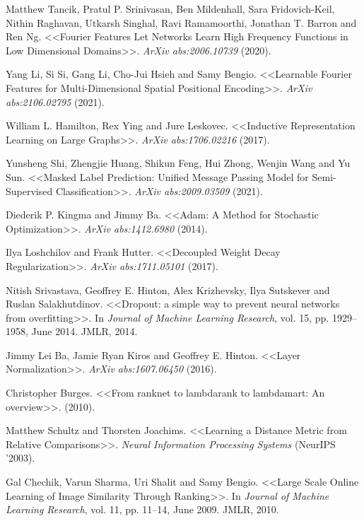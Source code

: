 \begin{thebibliography}{1}
 Matthew Tancik, Pratul P. Srinivasan, Ben Mildenhall, Sara Fridovich-Keil, Nithin Raghavan, Utkarsh Singhal, Ravi Ramamoorthi, Jonathan T. Barron and Ren Ng. <<Fourier Features Let Networks Learn High Frequency Functions in Low Dimensional Domains>>. \textit{ArXiv abs:2006.10739} (2020).

 Yang Li, Si Si, Gang Li, Cho-Jui Hsieh and Samy Bengio. <<Learnable Fourier Features for Multi-Dimensional Spatial Positional Encoding>>. \textit{ArXiv abs:2106.02795} (2021).

 William L. Hamilton, Rex Ying and Jure Leskovec. <<Inductive Representation Learning on Large Graphs>>.  \textit{ArXiv abs:1706.02216} (2017).

 Yunsheng Shi, Zhengjie Huang, Shikun Feng, Hui Zhong, Wenjin Wang and Yu Sun. <<Masked Label Prediction: Unified Message Passing Model for Semi-Supervised Classification>>. \textit{ArXiv abs:2009.03509} (2021).

 Diederik P. Kingma and Jimmy Ba. <<Adam: A Method for Stochastic Optimization>>. \textit{ArXiv abs:1412.6980} (2014).

 Ilya Loshchilov and Frank Hutter. <<Decoupled Weight Decay Regularization>>. \textit{ArXiv abs:1711.05101} (2017).

 Nitish Srivastava, Geoffrey E. Hinton, Alex Krizhevsky, Ilya Sutskever and Ruslan Salakhutdinov. <<Dropout: a simple way to prevent neural networks from overfitting>>. In \textit{Journal of Machine Learning Research}, vol. 15, pp. 1929--1958, June 2014. JMLR, 2014.

 Jimmy Lei Ba, Jamie Ryan Kiros and Geoffrey E. Hinton. <<Layer Normalization>>. \textit{ArXiv abs:1607.06450} (2016).

 Christopher Burges. <<From ranknet to lambdarank to lambdamart: An overview>>. (2010).

 Matthew Schultz and Thorsten Joachims. <<Learning a Distance Metric from Relative Comparisons>>. \textit{Neural Information Processing Systems} (NeurIPS '2003).

 Gal Chechik, Varun Sharma, Uri Shalit and Samy Bengio. <<Large Scale Online Learning of Image Similarity Through Ranking>>. In \textit{Journal of Machine Learning Research}, vol. 11, pp. 11--14, June 2009. JMLR, 2010.



\end{thebibliography}
